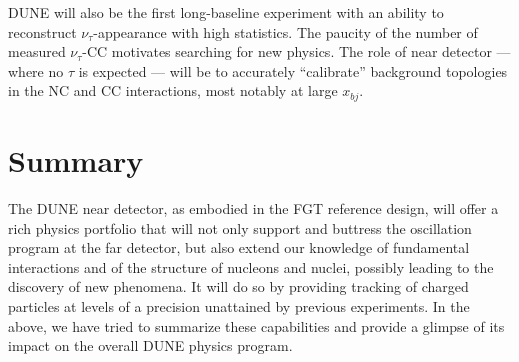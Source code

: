 DUNE will also be the first long-baseline experiment with an ability to 
reconstruct $\nu_\tau$-appearance with high statistics. The paucity of the number of measured 
$\nu_\tau$-CC motivates searching for new physics. 
The role of near detector --- where no $\tau$ is expected --- will be to accurately ``calibrate'' background topologies 
in the NC and CC interactions, most notably at large $x_{bj}$. 


\section{Summary}
\label{sec:physics-nd-summary}


The DUNE near detector, as embodied in the FGT reference design, will offer a rich physics portfolio that will not 
only support and buttress the oscillation program at the far detector, but also extend our knowledge of fundamental interactions 
and of the structure of nucleons and nuclei, possibly leading to the discovery of new phenomena. It will do 
so by providing tracking of charged particles at levels of a precision unattained by previous experiments.  
In the above, we have tried to summarize these capabilities and provide a glimpse of its 
impact on the overall DUNE physics program. 



%



